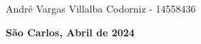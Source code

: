 \vspace*{1cm}

\setcounter{footnote}{1}

\renewcommand{\thefootnote}{\fnsymbol{footnote}}
\begin{center}
{
   
    \sc  André Vargas Villalba Codorniz - 14558436 \\ %
   
}
\vspace*{1cm}

\vspace*{-.8cm}
\end{center}

\baselineskip 17pt

\vspace*{1.5cm}
\begin{center}
    {{\bf São Carlos, Abril de 2024}} %
\end{center}

\vspace*{.05cm}

\renewcommand{\thefootnote}{\arabic{footnote}}

\setcounter{footnote}{1}

\pagebreak

\baselineskip 19pt